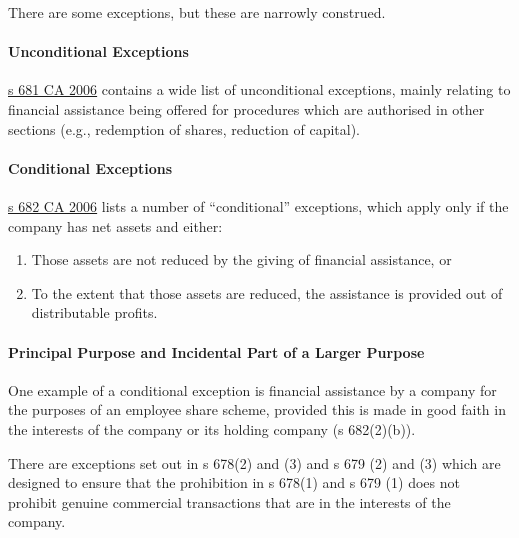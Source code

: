 \documentclass[
]{article}
\providecommand{\tightlist}{%
  \setlength{\itemsep}{0pt}\setlength{\parskip}{0pt}}
\begin{document}
There are some exceptions, but these are narrowly construed.

\hypertarget{unconditional-exceptions}{%
\paragraph{Unconditional Exceptions}\label{unconditional-exceptions}}

\href{https://www.legislation.gov.uk/ukpga/2006/46/section/681}{s 681 CA
2006} contains a wide list of unconditional exceptions, mainly relating
to financial assistance being offered for procedures which are
authorised in other sections (e.g., redemption of shares, reduction of
capital).

\hypertarget{conditional-exceptions}{%
\paragraph{Conditional Exceptions}\label{conditional-exceptions}}

\href{https://www.legislation.gov.uk/ukpga/2006/46/section/682}{s 682 CA
2006} lists a number of ``conditional'' exceptions, which apply only if
the company has net assets and either:

\begin{enumerate}
\def\labelenumi{\arabic{enumi}.}
\tightlist
\item
  Those assets are not reduced by the giving of financial assistance, or
\item
  To the extent that those assets are reduced, the assistance is
  provided out of distributable profits.
\end{enumerate}

\hypertarget{principal-purpose-and-incidental-part-of-a-larger-purpose}{%
\paragraph{Principal Purpose and Incidental Part of a Larger
Purpose}\label{principal-purpose-and-incidental-part-of-a-larger-purpose}}

One example of a conditional exception is financial assistance by a
company for the purposes of an employee share scheme, provided this is
made in good faith in the interests of the company or its holding
company (s 682(2)(b)).

There are exceptions set out in s 678(2) and (3) and s 679 (2) and (3)
which are designed to ensure that the prohibition in s 678(1) and s 679
(1) does not prohibit genuine commercial transactions that are in the
interests of the company.
\end{document}
